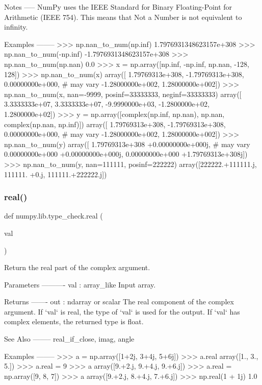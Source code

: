 \begin{DoxyVerb}
Notes
-----
NumPy uses the IEEE Standard for Binary Floating-Point for Arithmetic
(IEEE 754). This means that Not a Number is not equivalent to infinity.

Examples
--------
>>> np.nan_to_num(np.inf)
1.7976931348623157e+308
>>> np.nan_to_num(-np.inf)
-1.7976931348623157e+308
>>> np.nan_to_num(np.nan)
0.0
>>> x = np.array([np.inf, -np.inf, np.nan, -128, 128])
>>> np.nan_to_num(x)
array([ 1.79769313e+308, -1.79769313e+308,  0.00000000e+000, # may vary
       -1.28000000e+002,  1.28000000e+002])
>>> np.nan_to_num(x, nan=-9999, posinf=33333333, neginf=33333333)
array([ 3.3333333e+07,  3.3333333e+07, -9.9990000e+03, 
       -1.2800000e+02,  1.2800000e+02])
>>> y = np.array([complex(np.inf, np.nan), np.nan, complex(np.nan, np.inf)])
array([  1.79769313e+308,  -1.79769313e+308,   0.00000000e+000, # may vary
     -1.28000000e+002,   1.28000000e+002])
>>> np.nan_to_num(y)
array([  1.79769313e+308 +0.00000000e+000j, # may vary
         0.00000000e+000 +0.00000000e+000j,
         0.00000000e+000 +1.79769313e+308j])
>>> np.nan_to_num(y, nan=111111, posinf=222222)
array([222222.+111111.j, 111111.     +0.j, 111111.+222222.j])
\end{DoxyVerb}
 \mbox{\label{namespacenumpy_1_1lib_1_1type__check_ada19847ca30633d25ba2d178fcaf5a9c}} 
\subsubsection{\texorpdfstring{real()}{real()}}
{\footnotesize\ttfamily def numpy.\+lib.\+type\+\_\+check.\+real (\begin{DoxyParamCaption}\item[{}]{val }\end{DoxyParamCaption})}

\begin{DoxyVerb}Return the real part of the complex argument.

Parameters
----------
val : array_like
    Input array.

Returns
-------
out : ndarray or scalar
    The real component of the complex argument. If `val` is real, the type
    of `val` is used for the output.  If `val` has complex elements, the
    returned type is float.

See Also
--------
real_if_close, imag, angle

Examples
--------
>>> a = np.array([1+2j, 3+4j, 5+6j])
>>> a.real
array([1.,  3.,  5.])
>>> a.real = 9
>>> a
array([9.+2.j,  9.+4.j,  9.+6.j])
>>> a.real = np.array([9, 8, 7])
>>> a
array([9.+2.j,  8.+4.j,  7.+6.j])
>>> np.real(1 + 1j)
1.0\end{DoxyVerb}
 \mbox{\label{namespacenumpy_1_1lib_1_1type__check_a683f9ae38ede923459af21704a204578}} 

